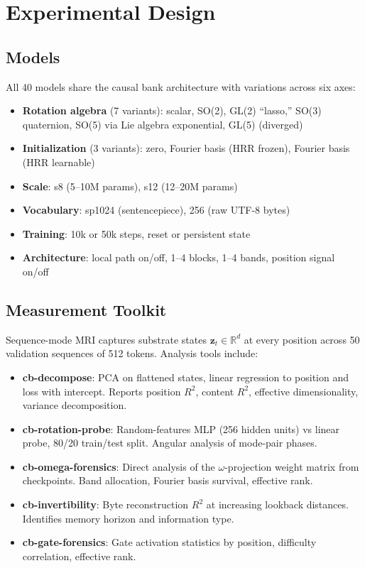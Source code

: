 \documentclass[11pt,a4paper]{article}
\begin{document}
\section{Experimental Design}

\subsection{Models}

All 40 models share the causal bank architecture with variations across six axes:

\begin{itemize}
\item \textbf{Rotation algebra} (7 variants): scalar, SO(2), GL(2) ``lasso,'' SO(3) quaternion, SO(5) via Lie algebra exponential, GL(5) (diverged)
\item \textbf{Initialization} (3 variants): zero, Fourier basis (HRR frozen), Fourier basis (HRR learnable)
\item \textbf{Scale}: s8 (5--10M params), s12 (12--20M params)
\item \textbf{Vocabulary}: sp1024 (sentencepiece), 256 (raw UTF-8 bytes)
\item \textbf{Training}: 10k or 50k steps, reset or persistent state
\item \textbf{Architecture}: local path on/off, 1--4 blocks, 1--4 bands, position signal on/off
\end{itemize}

\subsection{Measurement Toolkit}

Sequence-mode MRI captures substrate states $\mathbf{z}_t \in \mathbb{R}^d$ at every position across 50 validation sequences of 512 tokens. Analysis tools include:

\begin{itemize}
\item \textbf{cb-decompose}: PCA on flattened states, linear regression to position and loss with intercept. Reports position $R^2$, content $R^2$, effective dimensionality, variance decomposition.
\item \textbf{cb-rotation-probe}: Random-features MLP (256 hidden units) vs linear probe, 80/20 train/test split. Angular analysis of mode-pair phases.
\item \textbf{cb-omega-forensics}: Direct analysis of the $\omega$-projection weight matrix from checkpoints. Band allocation, Fourier basis survival, effective rank.
\item \textbf{cb-invertibility}: Byte reconstruction $R^2$ at increasing lookback distances. Identifies memory horizon and information type.
\item \textbf{cb-gate-forensics}: Gate activation statistics by position, difficulty correlation, effective rank.
\end{itemize}
\end{document}
